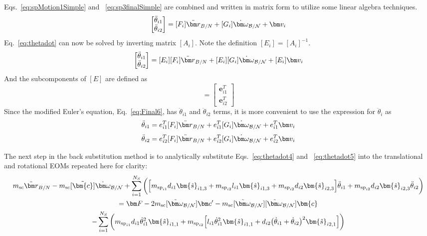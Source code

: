 Eqs.~\eqref{eq:spMotion1Simple} and ~\eqref{eq:sp3finalSimple} are combined and written in matrix form to utilize some linear algebra techniques.
\begin{equation}
	[A_i]\begin{bmatrix}
		\ddot \theta_{i1}\\
		\ddot \theta_{i2}
	\end{bmatrix}
	= [F_i] \ddot{\bm r}_{B/N} + [G_i]\dot{\bm\omega}_{\cal B/N} + \bm v_i
	\label{eq:thetadot}
\end{equation}
Eq.~\eqref{eq:thetadot} can now be solved by inverting matrix $[A_i]$. Note the definition $[E_i] = [A_i]^{-1}$.
\begin{equation}
	\begin{bmatrix}
		\ddot \theta_{i1}\\
		\ddot \theta_{i2}
	\end{bmatrix}
	= [E_i][F_i] \ddot{\bm r}_{B/N} + [E_i][G_i]\dot{\bm\omega}_{\cal B/N} + [E_i]\bm v_i
	\label{eq:thetadot2}
\end{equation}
And the subcomponents of $[E]$ are defined as
\begin{equation}
	[E] = \begin{bmatrix}
		\bm e_{i1}^T\\
		\bm e_{i2}^T
	\end{bmatrix}
	\label{eq:E}
\end{equation}
Since the modified Euler's equation, Eq.~\eqref{eq:Final6}, has $\ddot \theta_{i1}$ and $\ddot \theta_{i2}$ terms, it is more convenient to use the expression for $\ddot \theta_i$ as
\begin{equation}
	\ddot \theta_{i1}
	= e_{i1}^T[F_i] \ddot{\bm r}_{B/N} + e_{i1}^T[G_i]\dot{\bm\omega}_{\cal B/N} + e_{i1}^T\bm v_i
	\label{eq:thetadot4}
\end{equation}
\begin{equation}
	\ddot \theta_{i2}
	= e_{i2}^T[F_i] \ddot{\bm r}_{B/N} + e_{i2}^T[G_i]\dot{\bm\omega}_{\cal B/N} + e_{i2}^T\bm v_i
	\label{eq:thetadot5}
\end{equation}


The next step in the back substitution method is to analytically substitute Eqs.~\eqref{eq:thetadot4} and ~\eqref{eq:thetadot5} into the translational and rotational EOMs repeated here for clarity:
\begin{multline}
	m_\text{sc} \ddot{\bm r}_{B/N} -m_\text{sc} [\tilde{\bm{c}}] \dot{\bm\omega}_{\cal B/N} +  \sum_{i=1}^{N_{S}}\bigg(\Big[m_{\text{sp}_{i1}}d_{i1} \bm{\hat{s}}_{i1,3} +m_{\text{sp}_{i2}}l_{i1} \bm{\hat{s}}_{i1,3}+m_{\text{sp}_{i2}} d_{i2}\bm{\hat{s}}_{i2,3}\Big]\ddot{\theta}_{i1} +m_{\text{sp}_{i2}} d_{i2} \bm{\hat{s}}_{i2,3}\ddot{\theta}_{i2}\bigg) \\
	= \bm F - 2m_\text{sc} [\tilde{\bm\omega}_{\cal B/N}] \bm c'- m_\text{sc} [\tilde{\bm\omega}_{\cal B/N}][\tilde{\bm\omega}_{\cal B/N}]\bm{c}\\
	-\sum_{i=1}^{N_{S}}\bigg(m_{\text{sp}_{i1}}d_{i1} \dot{\theta}_{i1}^2 \bm{\hat{s}}_{i1,1} +m_{\text{sp}_{i2}}\Big[l_{i1} \dot{\theta}_{i1}^2 \bm{\hat{s}}_{i1,1} + d_{i2}\big(\dot{\theta}_{i1} + \dot{\theta}_{i2}\big)^2\bm{\hat{s}}_{i2,1}\Big]\bigg)
	\label{eq:Rbddot4}
\end{multline}

